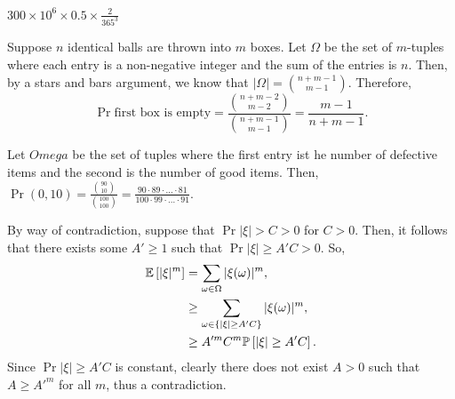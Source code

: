\begin{problem}{1}
\end{problem}
\begin{solution} 
    $300\times {10}^{6} \times 0.5 \times \frac{2}{365^3}$
\end{solution}
\begin{problem}{2}
\end{problem}
\begin{solution}
    Suppose $n$ identical balls are thrown into $m$ boxes. Let $\Omega$ be the
    set of $m$-tuples where each entry is a non-negative integer and the sum of
    the entries is $n$. Then, by a stars and bars argument, we know that
    $|\Omega| = \binom{n+m-1}{m-1}$. Therefore, 
    \[
      \Pr{\text{first box is empty}} = \frac{\binom{n+m-2}{m-2}}{\binom{n+m-1}{m-1}} = \frac{m-1}{n+m-1}.
    \]
\end{solution}
\begin{problem}{3} 
\end{problem}
\begin{solution}
    Let $Omega$ be the set of tuples where the first entry ist he number of
    defective items and the second is the number of good items. Then,
    $\Pr{(0,10)} = \frac{\binom{90}{10}}{\binom{100}{100}} = \frac{90\cdot 89
    \cdot \ldots \cdot 81}{100 \cdot 99 \cdot \ldots \cdot 91}$.
\end{solution}
\begin{problem}{4}
\end{problem}
\begin{solution}
    By way of contradiction, suppose that $\Pr{|\xi| > C} > 0$ for $C > 0$.
    Then, it follows that there exists some $A' \geq 1$ such that $\Pr{|\xi|
    \geq A'C} > 0$. So, 
    \begin{align*}
        \mathbb{E}\left[|\xi|^m\right] &= \sum_{\omega \in \Omega} |\xi(\omega)|^m, \\
        &\geq \sum_{\omega \in \left\{ |\xi| \geq A'C \right\}} |\xi(\omega)|^m, \\
        &\geq A'^mC^m\mathbb{P}\left[|\xi| \geq A'C\right].
    \end{align*}
    Since $\Pr{|\xi| \geq A'C}$ is constant, clearly there does not exist $A >
    0$ such that $A \geq A'^m$ for all $m$, thus a contradiction.
\end{solution}
\newpage
\begin{problem}{5}
\end{problem}
